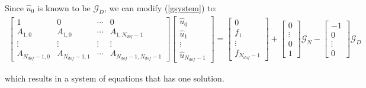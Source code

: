 Since $\hat u_0$ is known to be $\mathcal{G}_D$, we can modify
(\ref{gsystem}) to:
\begin{eqnarray}
\label{g2system}
\begin{bmatrix}
    1               & 0         &\cdots     & 0   \\
    A_{1,0}         & A_{1,0}   &\cdots     & A_{1,N_{dof}-1}   \\
    \vdots          &\vdots     &\vdots     &\vdots        \\
    A_{N_{dof}-1,0} & A_{N_{dof}-1,1} &\cdots     & A_{N_{dof}-1,N_{dof}-1}
\end{bmatrix}
\begin{bmatrix}
    \hat u_0    \\
    \hat u_1    \\
    \vdots      \\
    \hat u_{N_{dof}-1}
\end{bmatrix}
=
\begin{bmatrix}
    0       \\
    f_1     \\
    \vdots  \\
    f_{N_{dof}-1}
\end{bmatrix}
+
\begin{bmatrix}
    0       \\
    \vdots  \\
    0       \\
    1
\end{bmatrix}
\mathcal{G}_N
-
\begin{bmatrix}
    -1       \\
    0       \\
    \vdots  \\
    0
\end{bmatrix}
\mathcal{G}_D
\end{eqnarray}

which results in a system of equations that has one solution.

